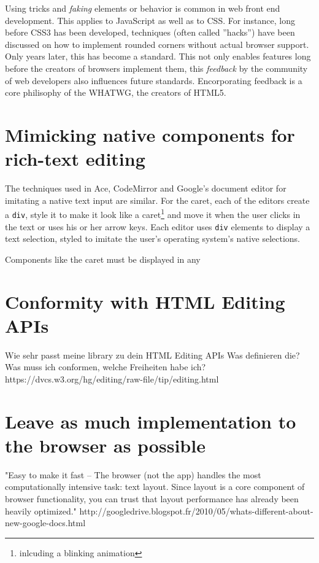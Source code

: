 Using tricks and \textit{faking} elements or behavior is common in web front end development. This applies to JavaScript as well as to CSS. For instance, long before CSS3 has been developed, techniques (often called ''hacks'') have been discussed on how to implement rounded corners without actual browser support. Only years later, this has become a standard. This not only enables features long before the creators of browsers implement them, this \textit{feedback} by the community of web developers also influences future standards. Encorporating feedback is a core philisophy of the WHATWG, the creators of HTML5.

\section{Mimicking native components for rich-text editing}

The techniques used in Ace, CodeMirror and Google's document editor for imitating a native text input are similar. For the caret, each of the editors create a \texttt{div}, style it to make it look like a caret\footnote{inlcuding a blinking animation} and move it when the user clicks in the text or uses his or her arrow keys. Each editor uses \texttt{div} elements to display a text selection, styled to imitate the user's operating system's native selections.

Components like the caret must be displayed in any


\section{Conformity with HTML Editing APIs}
Wie sehr passt meine library zu dein HTML Editing APIs
Was definieren die?
Was muss ich conformen, welche Freiheiten habe ich?
https://dvcs.w3.org/hg/editing/raw-file/tip/editing.html

\section{Leave as much implementation to the browser as possible} 

"Easy to make it fast -- The browser (not the app) handles the most computationally intensive task: text layout. Since layout is a core component of browser functionality, you can trust that layout performance has already been heavily optimized." http://googledrive.blogspot.fr/2010/05/whats-different-about-new-google-docs.html

